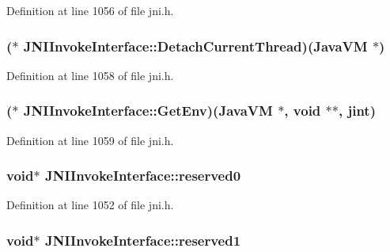 Definition at line 1056 of file jni.\-h.

\hypertarget{struct_j_n_i_invoke_interface_a722aaa4bbb55bfa50fc4b9e3f3ca4a68}{
\subsubsection[{Detach\-Current\-Thread}]{($\ast$ J\-N\-I\-Invoke\-Interface\-::\-Detach\-Current\-Thread)({\bf Java\-V\-M} $\ast$)}}\label{struct_j_n_i_invoke_interface_a722aaa4bbb55bfa50fc4b9e3f3ca4a68}


Definition at line 1058 of file jni.\-h.

\hypertarget{struct_j_n_i_invoke_interface_a9aac5046fc512129703bb6215c9d60b6}{
\subsubsection[{Get\-Env}]{($\ast$ J\-N\-I\-Invoke\-Interface\-::\-Get\-Env)({\bf Java\-V\-M} $\ast$, void $\ast$$\ast$, {\bf jint})}}\label{struct_j_n_i_invoke_interface_a9aac5046fc512129703bb6215c9d60b6}


Definition at line 1059 of file jni.\-h.

\hypertarget{struct_j_n_i_invoke_interface_a1e45369a2faf34db2441e17c2b59b4c5}{
\subsubsection[{reserved0}]{\setlength{\rightskip}{0pt plus 5cm}void$\ast$ J\-N\-I\-Invoke\-Interface\-::reserved0}}\label{struct_j_n_i_invoke_interface_a1e45369a2faf34db2441e17c2b59b4c5}


Definition at line 1052 of file jni.\-h.

\hypertarget{struct_j_n_i_invoke_interface_a34cafbab0675adc150e12eaf4710eb37}{
\subsubsection[{reserved1}]{\setlength{\rightskip}{0pt plus 5cm}void$\ast$ J\-N\-I\-Invoke\-Interface\-::reserved1}}\label{struct_j_n_i_invoke_interface_a34cafbab0675adc150e12eaf4710eb37}


